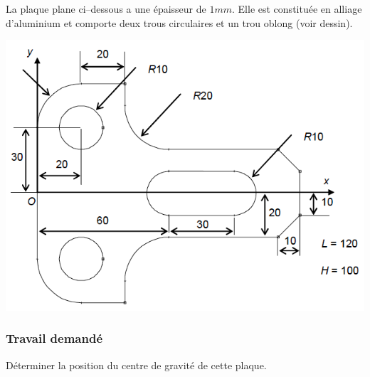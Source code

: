 \newpage


La plaque plane ci–dessous a une épaisseur de $1 mm$. Elle est constituée en alliage d'aluminium et comporte deux trous circulaires et un trou oblong (voir dessin).

\begin{center}
\includegraphics[scale=0.5]{png/piece_alu.png}
\end{center}

\subsubsection{Travail demandé}
Déterminer la position du centre de gravité de cette plaque.


\correction{ 
\[ \overrightarrow{OG}=44,997.\overrightarrow{x}  \text{(en mm)}\]
}
\newpage


